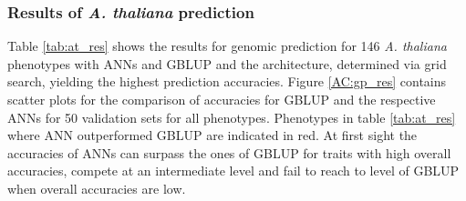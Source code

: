 \subsubsection{Results of \textit{A. thaliana} prediction}
Table \ref{tab:at_res} shows the results for genomic prediction for 146
\textit{A. thaliana} phenotypes with ANNs and GBLUP and the architecture, determined via
grid search, yielding the highest prediction accuracies.  Figure \ref{AC:gp_res} contains
scatter plots for the comparison of accuracies for GBLUP and the respective ANNs for 50
validation sets for all phenotypes. Phenotypes in table \ref{tab:at_res} where ANN
outperformed GBLUP are indicated in red. At first sight the accuracies of ANNs can surpass
the ones of GBLUP for traits with high overall accuracies, compete at an intermediate
level and fail to reach to level of GBLUP when overall accuracies are low.

